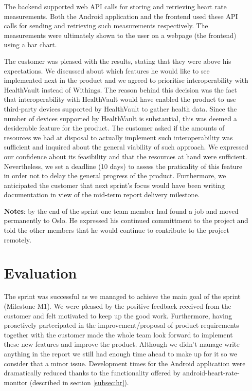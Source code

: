 The backend supported web API calls for storing and retrieving heart rate measurements.
Both the Android application and the frontend used these API calls for sending and retrieving
such measurements respectively.
The measurements were ultimately shown to the user on a webpage (the frontend) using a bar chart.

The customer was pleased with the results, stating that they were above his expectations.
We discussed about which features he would like to see implemented next in the product
and we agreed to prioritise interoperability with HealthVault instead of Withings.
The reason behind this decision was the fact that interoperability with HealthVault would have
enabled the product to use third-party devices supported by HealthVault to gather health data.
Since the number of devices supported by HealthVault is substantial, this was deemed a
desiderable feature for the product.
The customer asked if the amounts of resources we had at disposal to actually implement
such interoperability was sufficient and inquired about the general viability of such approach.
We expressed our confidence about its feasibility and that the resources at hand were sufficient.
Nevertheless, we set a deadline (10 days) to assess the praticality of this feature in order not to delay
the general progress of the product.
Furthermore, we anticipated the customer that next sprint's focus would have been writing documentation
in view of the mid-term report delivery milestone.

\textbf{Notes}: by the end of the sprint one team member had found a job and moved permanently to Oslo.
He expressed his continued committment to the project and told the other members that he would continue
to contribute to the project remotely.

\section{Evaluation}

The sprint was successful as we managed to achieve the main goal of the sprint (Milestone M1).
We were pleased by the positive feedback received from the customer and felt motivated to
keep up the good work. Furthermore, having proactively partecipated in the improvement/proposal
of product requirements together with the customer made the whole team look forward to implement these new
features and improve the product. Although we didn't manage write anything in the report we still had enough
time ahead to make up for it so we consider that a minor issue.
Development times for the Android application were dramatically reduced thanks to the functionality
offered by android-heart-rate-monitor (described in section \ref{subsec:hr}).

